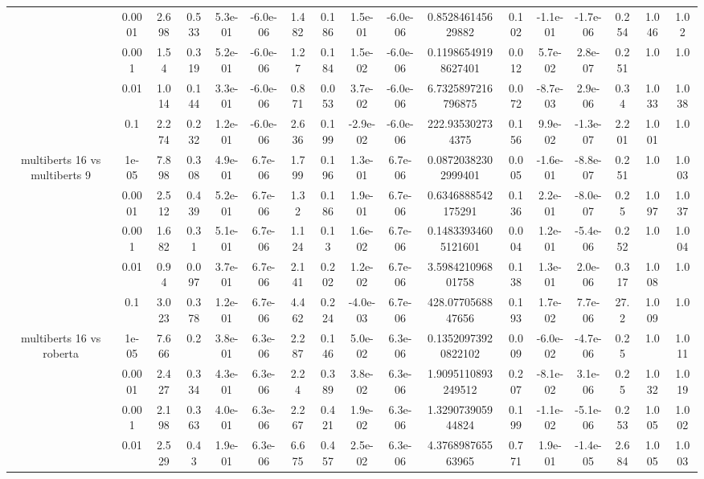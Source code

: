 \begin{tabular}{|c|c|c|c|c|c|c|c|c|c|c|c|c|c|c|c|c|}
 & 0.0001 & 2.698 & 0.533 & 5.3e-01 & -6.0e-06 & 1.482 & 0.186 & 1.5e-01 & -6.0e-06 & 0.852846145629882 & 0.102 & -1.1e-01 & -1.7e-06 & 0.254 & 1.046 & 1.02 \\
 & 0.001 & 1.54 & 0.319 & 5.2e-01 & -6.0e-06 & 1.27 & 0.184 & 1.5e-02 & -6.0e-06 & 0.11986549198627401 & 0.012 & 5.7e-02 & 2.8e-07 & 0.251 & 1.0 & 1.0 \\
 & 0.01 & 1.014 & 0.144 & 3.3e-01 & -6.0e-06 & 0.871 & 0.053 & 3.7e-02 & -6.0e-06 & 6.7325897216796875 & 0.072 & -8.7e-03 & 2.9e-06 & 0.34 & 1.033 & 1.038 \\
 & 0.1 & 2.274 & 0.232 & 1.2e-01 & -6.0e-06 & 2.636 & 0.199 & -2.9e-02 & -6.0e-06 & 222.935302734375 & 0.156 & 9.9e-02 & -1.3e-07 & 2.201 & 1.001 & 1.0 \\
\hline
\multirow{5}{*}{multiberts 16 vs multiberts 9} & 1e-05 & 7.898 & 0.308 & 4.9e-01 & 6.7e-06 & 1.799 & 0.196 & 1.3e-01 & 6.7e-06 & 0.08720382302999401 & 0.005 & -1.6e-01 & -8.8e-07 & 0.251 & 1.0 & 1.003 \\
 & 0.0001 & 2.512 & 0.439 & 5.2e-01 & 6.7e-06 & 1.32 & 0.186 & 1.9e-01 & 6.7e-06 & 0.6346888542175291 & 0.136 & 2.2e-01 & -8.0e-07 & 0.25 & 1.097 & 1.037 \\
 & 0.001 & 1.682 & 0.31 & 5.1e-01 & 6.7e-06 & 1.124 & 0.13 & 1.6e-02 & 6.7e-06 & 0.14833934605121601 & 0.004 & 1.2e-01 & -5.4e-06 & 0.252 & 1.0 & 1.004 \\
 & 0.01 & 0.94 & 0.097 & 3.7e-01 & 6.7e-06 & 2.141 & 0.202 & 1.2e-02 & 6.7e-06 & 3.598421096801758 & 0.138 & 1.3e-01 & 2.0e-06 & 0.317 & 1.008 & 1.0 \\
 & 0.1 & 3.023 & 0.378 & 1.2e-01 & 6.7e-06 & 4.462 & 0.224 & -4.0e-03 & 6.7e-06 & 428.0770568847656 & 0.193 & 1.7e-02 & 7.7e-06 & 27.2 & 1.009 & 1.0 \\
\hline
\multirow{5}{*}{multiberts 16 vs roberta } & 1e-05 & 7.666 & 0.2 & 3.8e-01 & 6.3e-06 & 2.287 & 0.146 & 5.0e-02 & 6.3e-06 & 0.13520973920822102 & 0.009 & -6.0e-02 & -4.7e-06 & 0.25 & 1.0 & 1.011 \\
 & 0.0001 & 2.427 & 0.334 & 4.3e-01 & 6.3e-06 & 2.24 & 0.389 & 3.8e-02 & 6.3e-06 & 1.9095110893249512 & 0.207 & -8.1e-02 & 3.1e-06 & 0.25 & 1.032 & 1.019 \\
 & 0.001 & 2.198 & 0.363 & 4.0e-01 & 6.3e-06 & 2.267 & 0.421 & 1.9e-02 & 6.3e-06 & 1.329073905944824 & 0.199 & -1.1e-02 & -5.1e-06 & 0.253 & 1.005 & 1.002 \\
 & 0.01 & 2.529 & 0.43 & 1.9e-01 & 6.3e-06 & 6.675 & 0.457 & 2.5e-02 & 6.3e-06 & 4.376898765563965 & 0.771 & 1.9e-01 & -1.4e-05 & 2.684 & 1.005 & 1.003 \\

\end{tabular}
